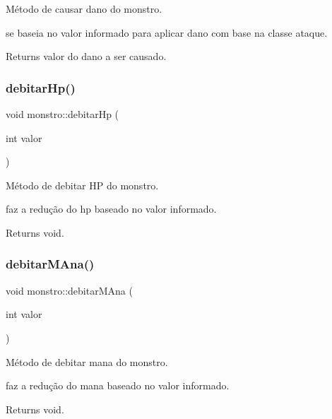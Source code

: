 Método de causar dano do monstro. 

se baseia no valor informado para aplicar dano com base na classe ataque. \begin{DoxyReturn}{Returns}
valor do dano a ser causado. 
\end{DoxyReturn}
\mbox{\label{classmonstro_a2753a130e042a12b9a5be36cb01deba5}} 
\subsubsection{\texorpdfstring{debitar\+Hp()}{debitarHp()}}
{\footnotesize\ttfamily void monstro\+::debitar\+Hp (\begin{DoxyParamCaption}\item[{int}]{valor }\end{DoxyParamCaption})}



Método de debitar HP do monstro. 

faz a redução do hp baseado no valor informado. \begin{DoxyReturn}{Returns}
void. 
\end{DoxyReturn}
\mbox{\label{classmonstro_a1dfc486d9da7e45f0afc2da3aebfe4f8}} 
\subsubsection{\texorpdfstring{debitar\+M\+Ana()}{debitarMAna()}}
{\footnotesize\ttfamily void monstro\+::debitar\+M\+Ana (\begin{DoxyParamCaption}\item[{int}]{valor }\end{DoxyParamCaption})}



Método de debitar mana do monstro. 

faz a redução do mana baseado no valor informado. \begin{DoxyReturn}{Returns}
void. 
\end{DoxyReturn}
\mbox{\label{classmonstro_a256135af5123c6927214fd6ed6d72270}} 
